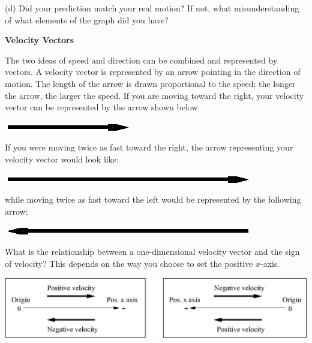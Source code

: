 (d) Did your prediction match your real motion? If not, what misunderstanding
of what elements of the graph did you have?
\answerspace{20mm}

\pagebreak[2]
\textbf{Velocity Vectors} 

The two ideas of speed and direction can be combined and represented by vectors.
A velocity vector is represented by an arrow pointing in the direction of motion.
The length of the arrow is drawn proportional to the speed; the longer the arrow,
the larger the speed. If you are moving toward the right, your velocity vector
can be represented by the arrow shown below.

\vspace{0.3cm}
{\par\centering \includegraphics{velocity/velocity_fig3.eps} \par}
\vspace{0.3cm}

If you were moving twice as fast toward the right, the arrow representing your
velocity vector would look like:

\vspace{0.3cm}
{\par\centering \includegraphics{velocity/velocity_fig4.eps} \par}
\vspace{0.3cm}

while moving twice as fast toward the left would be represented by the following
arrow:

\vspace{0.3cm}
{\par\centering \includegraphics{velocity/velocity_fig5.eps} \par}
\vspace{0.3cm}

What is the relationship between a one-dimensional velocity vector and the sign
of velocity? This depends on the way you choose to set the positive $x$-axis.

\vspace{0.3cm}
{\par\centering \includegraphics{velocity/velocity_fig6.eps} \par}
\vspace{0.3cm}

